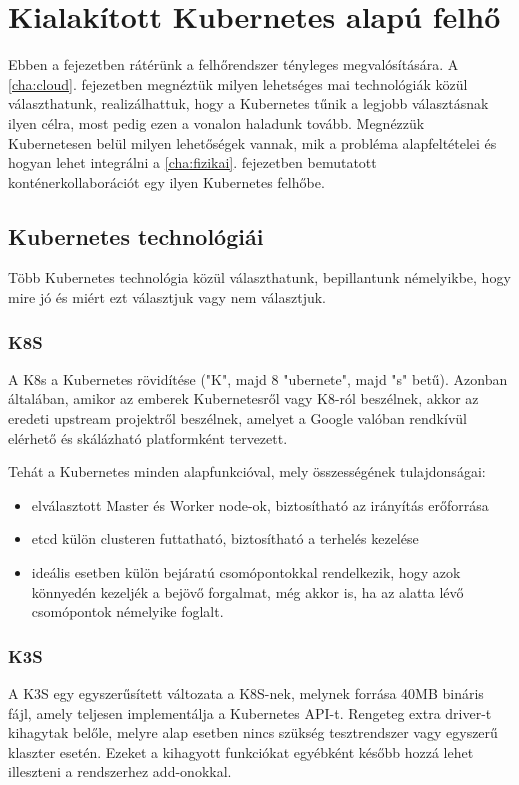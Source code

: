 \chapter{Kialakított Kubernetes alapú felhő}

Ebben a fejezetben rátérünk a felhőrendszer tényleges megvalósítására. A \ref{cha:cloud}. fejezetben megnéztük milyen lehetséges mai technológiák közül választhatunk, realizálhattuk, hogy a Kubernetes tűnik a legjobb választásnak ilyen célra, most pedig ezen a vonalon haladunk tovább. Megnézzük Kubernetesen belül milyen lehetőségek vannak, mik a probléma alapfeltételei és hogyan lehet integrálni a \ref{cha:fizikai}. fejezetben bemutatott konténerkollaborációt egy ilyen Kubernetes felhőbe.

\section{Kubernetes technológiái}
Több Kubernetes technológia közül választhatunk, bepillantunk némelyikbe, hogy mire jó és miért ezt választjuk vagy nem választjuk.

\subsection{K8S}

A K8s a Kubernetes rövidítése ("K", majd 8 "ubernete", majd "s" betű). Azonban általában, amikor az emberek Kubernetesről vagy K8-ról beszélnek, akkor az eredeti upstream projektről beszélnek, amelyet a Google valóban rendkívül elérhető és skálázható platformként tervezett.

Tehát a Kubernetes minden alapfunkcióval, mely összességének tulajdonságai:
\begin{itemize}
	\item elválasztott Master és Worker node-ok, biztosítható az irányítás erőforrása
	\item etcd külön clusteren futtatható, biztosítható a terhelés kezelése
	\item ideális esetben külön bejáratú csomópontokkal rendelkezik, hogy azok könnyedén kezeljék a bejövő forgalmat, még akkor is, ha az alatta lévő csomópontok némelyike foglalt. \cite{k8svsk3s}
\end{itemize}
\subsection{K3S}
A K3S egy egyszerűsített változata a K8S-nek, melynek forrása 40MB bináris fájl, amely teljesen implementálja a Kubernetes API-t. Rengeteg extra driver-t kihagytak belőle, melyre alap esetben nincs szükség tesztrendszer vagy egyszerű klaszter esetén. Ezeket a kihagyott funkciókat egyébként később hozzá lehet illeszteni a rendszerhez add-onokkal. \cite{k8svsk3s}
